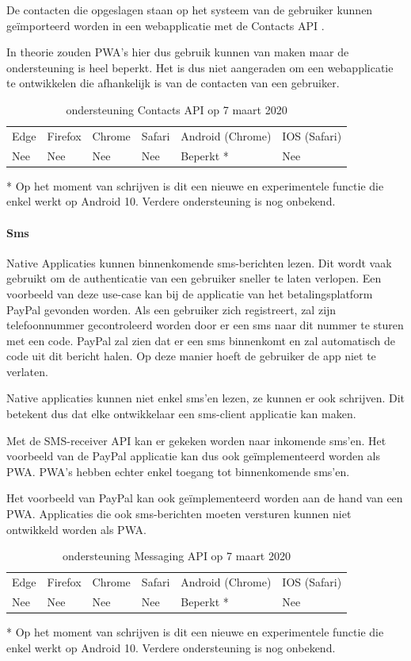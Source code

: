 De contacten die opgeslagen staan op het systeem van de gebruiker kunnen geïmporteerd worden in een webapplicatie met de Contacts API \autocite{Tibbett2014}.

In theorie zouden PWA's hier dus gebruik kunnen van maken maar de ondersteuning is heel beperkt. Het is dus niet aangeraden om een webapplicatie te ontwikkelen die afhankelijk is van de contacten van een gebruiker.

\begin{table}[H]
	\centering
	\begin{tabular}{llllll}
		Edge & Firefox & Chrome & Safari & Android (Chrome) & IOS (Safari) \\
		Nee   & Nee      &  Nee     & Nee     & Beperkt *               & Nee          
	\end{tabular}	
	\caption{ondersteuning Contacts API op 7 maart 2020}{ * Op het moment van schrijven is dit een nieuwe en experimentele functie die enkel werkt op 
	Android 10. Verdere ondersteuning is nog onbekend.}
\end{table}	


\paragraph{Sms}
Native Applicaties kunnen binnenkomende sms-berichten lezen. Dit wordt vaak gebruikt om de authenticatie van een gebruiker sneller te laten verlopen. Een voorbeeld van deze use-case kan bij de applicatie van het betalingsplatform PayPal gevonden worden. Als een gebruiker zich registreert, zal zijn telefoonnummer gecontroleerd worden door er een sms naar dit nummer te sturen met een code. PayPal zal zien dat er een sms binnenkomt en zal automatisch de code uit dit bericht halen. Op deze manier hoeft de gebruiker de app niet te verlaten.

Native applicaties kunnen niet enkel sms’en lezen, ze kunnen er ook schrijven. Dit betekent dus dat elke ontwikkelaar een sms-client applicatie kan maken.

Met de SMS-receiver API \autocite{Fullea2015} kan er gekeken worden naar inkomende sms’en. Het voorbeeld van de PayPal applicatie kan dus ook geïmplementeerd worden als PWA. PWA's hebben echter enkel toegang tot binnenkomende sms’en. 

Het voorbeeld van PayPal kan ook geïmplementeerd worden aan de hand van een PWA. Applicaties die ook sms-berichten moeten versturen kunnen niet ontwikkeld worden als PWA.

\begin{table}[H]
	\centering
	\begin{tabular}{llllll}
		Edge & Firefox & Chrome & Safari & Android (Chrome) & IOS (Safari) \\
		Nee   & Nee      &  Nee     & Nee     & Beperkt *             & Nee          
	\end{tabular}	
	\caption{ondersteuning Messaging API op 7 maart 2020}{* Op het moment van schrijven is dit een nieuwe en experimentele functie die enkel werkt op 
		Android 10. Verdere ondersteuning is nog onbekend.}
\end{table}	



